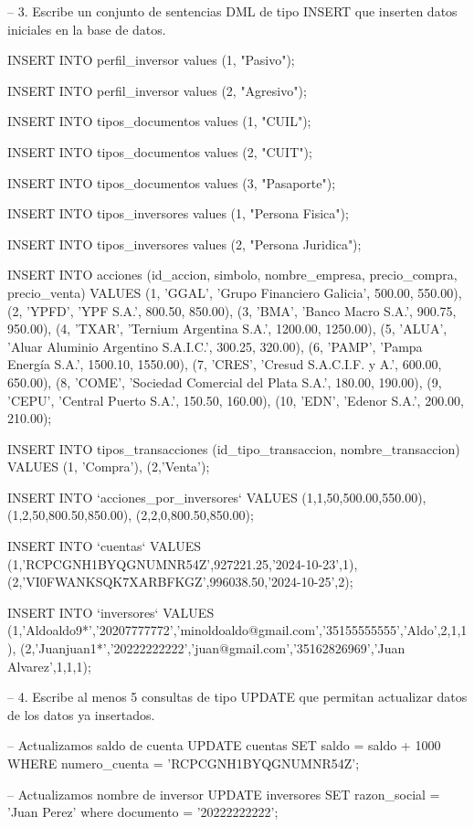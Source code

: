 – 3. Escribe un conjunto de sentencias DML de tipo INSERT que inserten datos iniciales
en la base de datos.

INSERT INTO perfil_inversor values (1, "Pasivo");

INSERT INTO perfil_inversor values (2, "Agresivo");

INSERT INTO tipos_documentos values (1, "CUIL");

INSERT INTO tipos_documentos values (2, "CUIT");

INSERT INTO tipos_documentos values (3, "Pasaporte");

INSERT INTO tipos_inversores values (1, "Persona Fisica");

INSERT INTO tipos_inversores values (2, "Persona Juridica");



INSERT INTO acciones (id_accion, simbolo, nombre_empresa, precio_compra, precio_venta) VALUES 
(1, 'GGAL', 'Grupo Financiero Galicia', 500.00, 550.00),
(2, 'YPFD', 'YPF S.A.', 800.50, 850.00),
(3, 'BMA', 'Banco Macro S.A.', 900.75, 950.00),
(4, 'TXAR', 'Ternium Argentina S.A.', 1200.00, 1250.00),
(5, 'ALUA', 'Aluar Aluminio Argentino S.A.I.C.', 300.25, 320.00),
(6, 'PAMP', 'Pampa Energía S.A.', 1500.10, 1550.00),
(7, 'CRES', 'Cresud S.A.C.I.F. y A.', 600.00, 650.00),
(8, 'COME', 'Sociedad Comercial del Plata S.A.', 180.00, 190.00),
(9, 'CEPU', 'Central Puerto S.A.', 150.50, 160.00),
(10, 'EDN', 'Edenor S.A.', 200.00, 210.00);



INSERT INTO tipos_transacciones (id_tipo_transaccion, nombre_transaccion) VALUES (1, 'Compra'), (2,'Venta');

INSERT INTO `acciones_por_inversores` VALUES (1,1,50,500.00,550.00),
(1,2,50,800.50,850.00),
(2,2,0,800.50,850.00);

INSERT INTO `cuentas` VALUES (1,'RCPCGNH1BYQGNUMNR54Z',927221.25,'2024-10-23',1),
(2,'VI0FWANKSQK7XARBFKGZ',996038.50,'2024-10-25',2);

INSERT INTO `inversores` VALUES (1,'Aldoaldo9*','20207777772','minoldoaldo@gmail.com','35155555555','Aldo',2,1,1),
(2,'Juanjuan1*','20222222222','juan@gmail.com','35162826969','Juan Alvarez',1,1,1);

– 4. Escribe al menos 5 consultas de tipo UPDATE que permitan actualizar datos de los
datos ya insertados.

– Actualizamos saldo de cuenta
UPDATE cuentas
SET saldo = saldo + 1000
WHERE numero_cuenta = 'RCPCGNH1BYQGNUMNR54Z';

– Actualizamos nombre de inversor
UPDATE inversores
SET razon_social = 'Juan Perez'
where documento = '20222222222';

